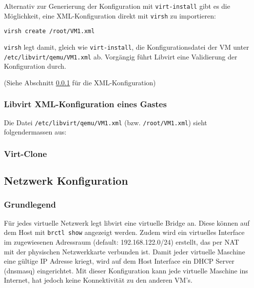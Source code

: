 Alternativ zur Generierung der Konfiguration mit \lstinline|virt-install| gibt es die Möglichkeit, eine XML-Konfiguration  direkt mit \lstinline|virsh| zu importieren:

\begin{lstlisting}
virsh create /root/VM1.xml
\end{lstlisting}

\lstinline|virsh| legt damit, gleich wie \lstinline|virt-install|, die Konfigurationsdatei der VM unter \lstinline|/etc/libvirt/qemu/VM1.xml| ab. Vorgängig führt Libvirt eine Validierung der Konfiguration durch.

(Siehe Abschnitt \ref{sec:libvirt-xml-konfiguration-eines-gastes} für die XML-Konfiguration)

\subsubsection{Libvirt XML-Konfiguration eines Gastes}\label{sec:libvirt-xml-konfiguration-eines-gastes}

Die Datei \lstinline|/etc/libvirt/qemu/VM1.xml| (bzw. \lstinline|/root/VM1.xml|) sieht folgendermassen aus:


\subsubsection{Virt-Clone}


\subsection{Netzwerk Konfiguration}


\subsubsection{Grundlegend}
Für jedes virtuelle Netzwerk legt libvirt eine virtuelle Bridge an. Diese können auf dem Host mit \lstinline|brctl show| angezeigt werden. Zudem wird ein virtuelles Interface im zugewiesenen Adressraum (default: 192.168.122.0/24) erstellt, das per NAT mit der physischen Netzwerkkarte verbunden ist. Damit jeder virtuelle Maschine eine gültige IP Adresse kriegt, wird auf dem Host Interface ein DHCP Server (dnsmasq) eingerichtet. Mit dieser Konfiguration kann jede virtuelle Maschine ins Internet, hat jedoch keine Konnektivität zu den anderen VM's. 

